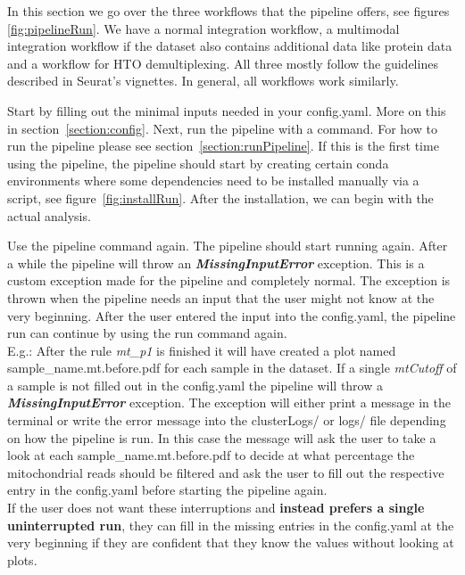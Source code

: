 In this section we go over the three workflows that the pipeline offers, see figures \ref{fig:pipelineRun}. We have a normal integration workflow, a multimodal integration workflow if the dataset also contains additional data like protein data and a workflow for HTO demultiplexing. All three mostly follow the guidelines described in Seurat's vignettes. In general, all workflows work similarly. 

Start by filling out the minimal inputs needed in your config.yaml. More on this in section~\ref{section:config}. Next, run the pipeline with a command. For how to run the pipeline please see section~\ref{section:runPipeline}. If this is the first time using the pipeline, the pipeline should start by creating certain conda environments where some dependencies need to be installed manually via a script, see figure~\ref{fig:installRun}. After the installation, we can begin with the actual analysis. 

Use the pipeline command again. The pipeline should start running again. After a while the pipeline will throw an \textbf{\textit{MissingInputError}} exception. This is a custom exception made for the pipeline and completely normal. The exception is thrown when the pipeline needs an input that the user might not know at the very beginning. After the user entered the input into the config.yaml, the pipeline run can continue by using the run command again.\\

E.g.: After the rule \textit{mt\_p1} is finished it will have created a plot named sample\_name.mt.before.pdf for each sample in the dataset. If a single \textit{mtCutoff} of a sample is not filled out in the config.yaml the pipeline will throw a \textbf{\textit{MissingInputError}} exception. The exception will either print a message in the terminal or write the error message into the clusterLogs/ or logs/ file depending on how the pipeline is run. In this case the message will ask the user to take a look at each sample\_name.mt.before.pdf to decide at what percentage the mitochondrial reads should be filtered and ask the user to fill out the respective entry in the config.yaml before starting the pipeline again.\\

If the user does not want these interruptions and \textbf{instead prefers a single uninterrupted run}, they can fill in the missing entries in the config.yaml at the very beginning if they are confident that they know the values without looking at plots.\\


